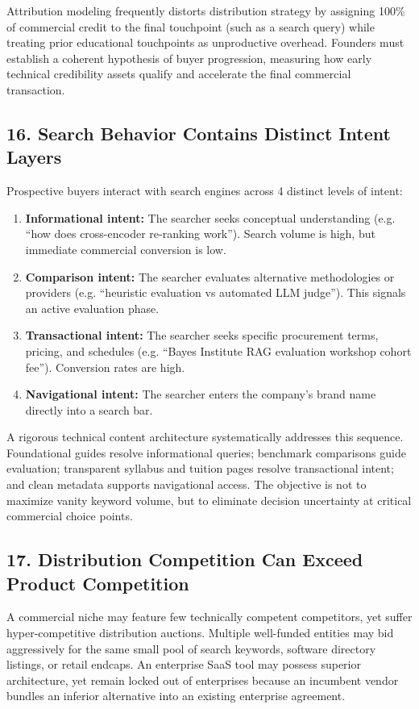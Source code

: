 Attribution modeling frequently distorts distribution strategy by assigning 100\% of commercial credit to the final touchpoint (such as a search query) while treating prior educational touchpoints as unproductive overhead. Founders must establish a coherent hypothesis of buyer progression, measuring how early technical credibility assets qualify and accelerate the final commercial transaction.

\subsection*{16. Search Behavior Contains Distinct Intent Layers}

Prospective buyers interact with search engines across 4 distinct levels of intent:
\begin{enumerate}[leftmargin=*,itemsep=1pt]
  \item \textbf{Informational intent:} The searcher seeks conceptual understanding (e.g. ``how does cross-encoder re-ranking work''). Search volume is high, but immediate commercial conversion is low.
  \item \textbf{Comparison intent:} The searcher evaluates alternative methodologies or providers (e.g. ``heuristic evaluation vs automated LLM judge''). This signals an active evaluation phase.
  \item \textbf{Transactional intent:} The searcher seeks specific procurement terms, pricing, and schedules (e.g. ``Bayes Institute RAG evaluation workshop cohort fee''). Conversion rates are high.
  \item \textbf{Navigational intent:} The searcher enters the company's brand name directly into a search bar.
\end{enumerate}

A rigorous technical content architecture systematically addresses this sequence. Foundational guides resolve informational queries; benchmark comparisons guide evaluation; transparent syllabus and tuition pages resolve transactional intent; and clean metadata supports navigational access. The objective is not to maximize vanity keyword volume, but to eliminate decision uncertainty at critical commercial choice points.

\subsection*{17. Distribution Competition Can Exceed Product Competition}

A commercial niche may feature few technically competent competitors, yet suffer hyper-competitive distribution auctions. Multiple well-funded entities may bid aggressively for the same small pool of search keywords, software directory listings, or retail endcaps. An enterprise SaaS tool may possess superior architecture, yet remain locked out of enterprises because an incumbent vendor bundles an inferior alternative into an existing enterprise agreement.

